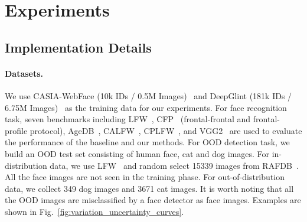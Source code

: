 \documentclass[letterpaper]{article} %
\begin{document}
\section{Experiments}
\label{sec:experiments}

\subsection{Implementation Details}
\label{ssec:details}


\paragraph{Datasets.}
%
We use CASIA-WebFace (10k IDs / 0.5M Images)~\cite{yi2014learning} and DeepGlint (181k IDs / 6.75M Images)~\cite{deepglint} as the training data for our experiments. For face recognition task, seven benchmarks including LFW~\cite{huang2008labeled}, CFP~\cite{sengupta2016frontal} (frontal-frontal and frontal-profile protocol), AgeDB~\cite{moschoglou2017agedb}, CALFW~\cite{zheng2017cross}, CPLFW~\cite{zheng2018cross}, and VGG2~\cite{cao2018vggface2} are used to evaluate the performance of the baseline and our methods. For OOD detection task, we build an OOD test set consisting of human face, cat and dog images. For in-distribution data, we use LFW~\cite{huang2008labeled} and random select 15339 images from RAFDB~\cite{li2017reliable}. All the face images are not seen in the training phase. For out-of-distribution data, we collect 349 dog images and 3671 cat images. It is worth noting that all the OOD images are misclassified by a face detector as face images. Examples are shown in Fig.~\ref{fig:variation_uncertainty_curves}.
\end{document}
